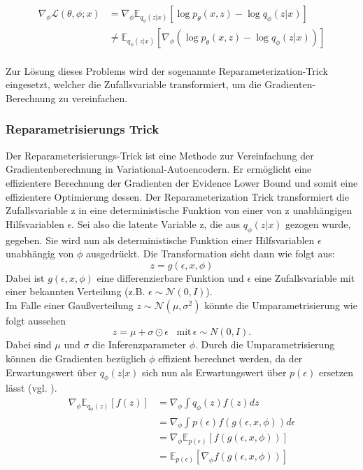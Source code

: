 \documentclass[%
thesis=student,%
coverpage=false,%
titlepage=false,%
headmarks=true, %
german,%
font=libertine, %
math=newpxtx, %
BCOR=5mm,%
coverBCOR=11mm%
]{tumbook}
\theoremstyle{break}
\begin{document}
\begin{align}
	\nabla_\phi \mathcal{L}(\theta,\phi;x) &= 	\nabla_\phi \mathbb{E}_{q_\phi(z|x)}\left[\log p_\theta(x,z)- \log q_\phi(z|x)\right] \\
	& \neq \mathbb{E}_{q_\phi(z|x)}\left[\nabla_\phi(\log p_\theta(x,z)- \log q_\phi(z|x))\right]
\end{align}
 \\
Zur Lösung dieses Problems wird der sogenannte Reparameterization-Trick eingesetzt, welcher die Zufallsvariable transformiert, um die Gradienten-Berechnung zu vereinfachen.  
\subsubsection{Reparametrisierungs Trick}
Der Reparameterisierungs-Trick ist eine Methode zur Vereinfachung der Gradientenberechnung in Variational-Autoencodern. Er ermöglicht eine effizientere Berechnung der Gradienten der Evidence Lower Bound und somit eine effizientere Optimierung dessen. Der Reparameterization Trick transformiert die Zufallsvariable z in eine deterministische Funktion von einer von z unabhängigen Hilfsvariablen $\epsilon$.
Sei also die latente Variable z, die aus $q_\phi(z|x)$ gezogen wurde, gegeben. Sie wird nun als deterministische Funktion einer Hilfsvariablen $\epsilon$ unabhängig von $\phi$ ausgedrückt. 
Die Transformation sieht dann wie folgt aus:
$$ z = g(\epsilon, x, \phi)$$
Dabei ist $g(\epsilon,x,\phi) $ eine differenzierbare Funktion und $\epsilon$ eine Zufallsvariable mit einer bekannten Verteilung (z.B. $\epsilon \sim \mathcal{N}(0,I)$).\\
Im Falle einer Gaußverteilung $z \sim \mathcal{N}(\mu, \sigma^2)$ könnte die Umparametrisierung wie folgt aussehen 
$$z=\mu + \sigma \odot \epsilon \hspace{10pt}\text{mit} \hspace{2pt} \epsilon\sim N(0,I).$$ 
Dabei sind $\mu$ und $\sigma$ die Inferenzparameter $\phi$.  Durch die Umparametrisierung können die Gradienten bezüglich $\phi$ effizient berechnet werden, da der Erwartungswert über $q_\phi(z|x)$ sich nun als Erwartungswert über $p(\epsilon)$ ersetzen lässt (vgl. \cite{MonteCarloEstimation}).
\begin{align}
	\nabla_\phi \mathbb{E}_{q_\phi(z)}[f(z)] &= \nabla_\phi \int q_\phi(z) f(z) dz \\
	&= \nabla_\phi \int p(\epsilon) f(g(\epsilon,x,\phi)) d\epsilon \\
	&= \nabla_\phi \mathbb{E}_{p(\epsilon)}[f(g(\epsilon,x, \phi))] \\
	& = \mathbb{E}_{p(\epsilon)}[\nabla_\phi f(g(\epsilon,x, \phi))]
\end{align}
\end{document}
